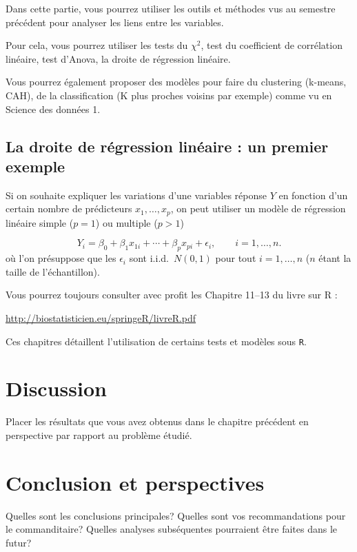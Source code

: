 \documentclass[mstat,12pt]{unswthesis}
\begin{document}
Dans cette partie, vous pourrez utiliser les outils et méthodes vus au
semestre précédent pour analyser les liens entre les variables.

Pour cela, vous pourrez utiliser les tests du \(\chi^2\), test du
coefficient de corrélation linéaire, test d'Anova, la droite de
régression linéaire.

Vous pourrez également proposer des modèles pour faire du clustering
(k-means, CAH), de la classification (K plus proches voisins par
exemple) comme vu en Science des données 1.

\section{La droite de régression linéaire : un premier
exemple}\label{la-droite-de-ruxe9gression-linuxe9aire-un-premier-exemple}

Si on souhaite expliquer les variations d'une variables réponse \(Y\) en
fonction d'un certain nombre de prédicteurs \(x_1,\ldots,x_p\), on peut
utiliser un modèle de régression linéaire simple (\(p=1\)) ou multiple
(\(p>1\))

\[
Y_i = \beta_0 + \beta_1 x_{1i} + \cdots +\beta_p x_{pi} + \epsilon_i, \qquad i=1,\ldots,n.
\] où l'on présuppose que les \(\epsilon_i\) sont i.i.d.~\(N(0,1)\) pour
tout \(i=1,\ldots,n\) (\(n\) étant la taille de l'échantillon).

Vous pourrez toujours consulter avec profit les Chapitre 11--13 du livre
sur R :

\url{http://biostatisticien.eu/springeR/livreR.pdf}

Ces chapitres détaillent l'utilisation de certains tests et modèles sous
\texttt{R}.

\chapter{Discussion}\label{discussion}

Placer les résultats que vous avez obtenus dans le chapitre précédent en
perspective par rapport au problème étudié.

\chapter{Conclusion et perspectives}\label{conclusion-et-perspectives}

Quelles sont les conclusions principales? Quelles sont vos
recommandations pour le commanditaire? Quelles analyses subséquentes
pourraient être faites dans le futur?
\end{document}
